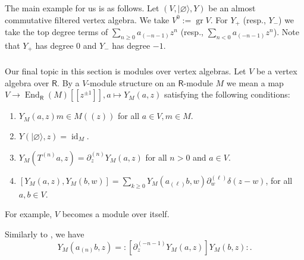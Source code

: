 \documentclass{amsart}
\theoremstyle{definition}
\newcommand{\Ring}{\mathsf{R}}
\newcommand{\Z}{\mathbb{Z}}
\numberwithin{equation}{section}
\begin{document}
The main example for us is as follows. Let $(V,|\varnothing\rangle, Y)$
be an almost commutative filtered vertex algebra. We take $V^0:=\operatorname{gr}V$. For $Y_+$ (resp., $Y_-$) we take the top degree terms of $\sum_{n\geqslant 0}a_{(-n-1)}z^n$ (resp., 
$\sum_{n<0}a_{(-n-1)}z^n$). Note that $Y_+$ has degree $0$ and $Y_-$
has degree $-1$.

\subsubsection{}\label{SSS_VA_modules} Our final topic in this section is modules over vertex algebras. Let $V$ be a vertex algebra over $\Ring$. By a $V$-module structure on an $\Ring$-module $M$ we mean a map $V\rightarrow \operatorname{End}_{\Ring}(M)[[z^{\pm 1}]], a\mapsto Y_M(a,z)$ satisfying the following conditions:
\begin{enumerate}
\item $Y_M(a,z)m\in M(\!(z)\!)$ for all $a\in V, m\in M$.
\item $Y(|\varnothing\rangle,z)=\operatorname{id}_M$.
\item $Y_M(T^{(n)}a,z)=\partial_z^{(n)}Y_M(a,z)$ for all $n>0$ and $a\in V$.
\item $[Y_M(a,z),Y_M(b,w)]=\sum_{k\geqslant 0}Y_M(a_{(\ell)}b,w)\partial_w^{(\ell)}\delta(z-w)$, for all $a,b\in V$.
\end{enumerate}
For example, $V$ becomes a module over itself. 

Similarly to \cite[(2.3-4)]{Frenkel_loop}, we have 
\begin{equation}\label{eq:module_normal_product}
Y_M(a_{(n)}b,z)=:[\partial_z^{(-n-1)}Y_M(a,z)]Y_M(b,z):.
\end{equation}

\end{document}

